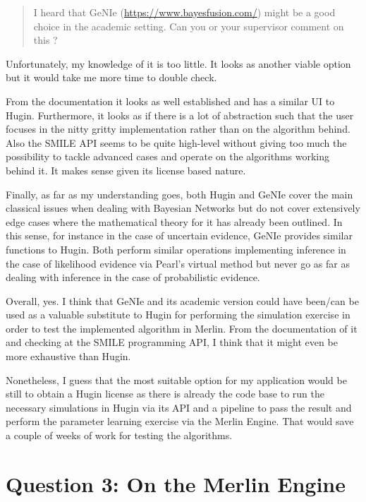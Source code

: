 \documentclass[a4paper]{article}
\begin{document}
\begin{quote}
I heard that GeNIe (\url{https://www.bayesfusion.com/}) might be a good
choice in the academic setting. Can you or your supervisor comment
on this ?
\end{quote}

Unfortunately, my knowledge of it is too little. It looks as another
viable option but it would take me more time to double check.

From the documentation it looks as well established and has a
similar UI to Hugin. Furthermore, it looks as if there is a lot of
abstraction such that the user focuses in the nitty gritty
implementation rather than on the algorithm behind. Also the SMILE
API seems to be quite high-level without giving too much the
possibility to tackle advanced cases and operate on the algorithms
working behind it. It makes sense given its license based nature.

Finally, as far as my understanding goes, both Hugin and GeNIe cover
the main classical issues when dealing with Bayesian Networks but do
not cover extensively edge cases where the mathematical theory for
it has already been outlined. In this sense, for instance in the
case of uncertain evidence, GeNIe provides similar functions to
Hugin. Both perform similar operations implementing inference in the
case of likelihood evidence via Pearl's virtual method but never
go as far as dealing with inference in the case of probabilistic
evidence.

Overall, yes. I think that GeNIe and its academic version could have
been/can be used as a valuable substitute to Hugin for performing
the simulation exercise in order to test the implemented algorithm
in Merlin. From the documentation of it and checking at the SMILE
programming API, I think that it might even be more exhaustive than
Hugin.

Nonetheless, I guess that the most suitable option for my
application would be still to obtain a Hugin license as there is
already the code base to run the necessary simulations in Hugin via
its API and a pipeline to pass the result and perform the parameter
learning exercise via the Merlin Engine. That would save a couple
of weeks of work for testing the algorithms.

\section{Question 3: On the Merlin Engine}
\label{sec:org5796e4d}
\end{document}
